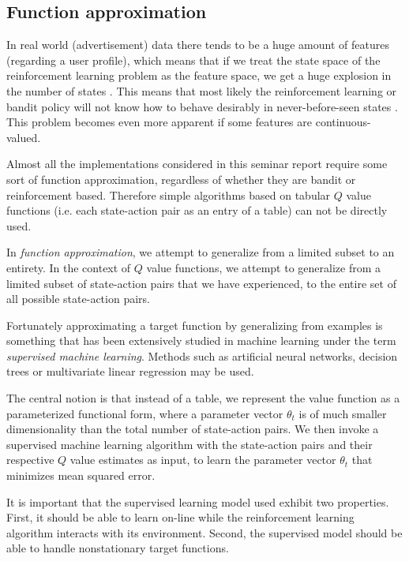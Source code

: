 \documentclass{article} %
\begin{document}
\subsection{Function approximation}
\label{sec:function_approximation}
In real world (advertisement) data there tends to be a huge amount of features
(regarding a user profile), which means that if we treat the state space of the
reinforcement learning problem as the feature space, we get a huge explosion in
the number of states \cite{abe2002empirical}.  This means that most likely the
reinforcement learning or bandit policy will not know how to behave desirably
in never-before-seen states \cite{book}. This problem becomes even more
apparent if some features are continuous-valued.

Almost all the implementations \cite{abe2002empirical, silver2013concurrent,
chapelle2011empirical} considered in this seminar report require some sort of
function approximation, regardless of whether they are bandit or reinforcement
based. Therefore simple algorithms based on tabular $Q$ value functions (i.e.
each state-action pair as an entry of a table) can not be directly used.

In \emph{function approximation}, we attempt to generalize from a limited
subset to an entirety. In the context of $Q$ value functions, we attempt to
generalize from a limited subset of state-action pairs that we have
experienced, to the entire set of all possible state-action pairs.

Fortunately approximating a target function by generalizing from examples is
something that has been extensively studied in machine learning under the term
\emph{supervised machine learning}. Methods such as artificial neural networks,
decision trees or multivariate linear regression may be used.

The central notion is that instead of a table, we represent the value function
as a parameterized functional form, where a parameter vector $\theta_t$ is of
much smaller dimensionality than the total number of state-action pairs. We
then invoke a supervised machine learning algorithm with the state-action pairs
and their respective $Q$ value estimates as input, to learn the parameter
vector $\theta_t$ that minimizes mean squared error.

It is important that the supervised learning model used exhibit two properties.
First, it should be able to learn on-line while the reinforcement learning
algorithm interacts with its environment. Second, the supervised model should
be able to handle nonstationary target functions.
\end{document}
